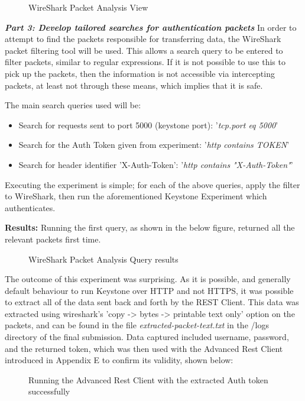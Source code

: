 \begin{figure}[H]
\centering
{}
\caption{WireShark Packet Analysis View}
\end{figure}

\textbf{\textit{Part 3: Develop tailored searches for authentication packets}}
In order to attempt to find the packets responsible for transferring data, the WireShark packet filtering tool will be used. This allows a search query to be entered to filter packets, similar to regular expressions. 
If it is not possible to use this to pick up the packets, then the information is not accessible via intercepting packets, at least not through these means, which implies that it is safe.

The main search queries used will be:
\begin{itemize}
\item Search for requests sent to port 5000 (keystone port):    '\textit{tcp.port eq 5000}' 
\item Search for the Auth Token given from experiment: '\textit{http contains TOKEN}' 
\item Search for header identifier 'X-Auth-Token':      '\textit{http contains "X-Auth-Token"}'
\end{itemize} 

Executing the experiment is simple; for each of the above queries, apply the filter to WireShark, then run the aforementioned Keystone Experiment which authenticates. 

\textbf{Results:} 
Running the first query, as shown in the below figure, returned all the relevant packets first time. 
\begin{figure}[H]
\centering
{}
\caption{WireShark Packet Analysis Query results}
\end{figure}

The outcome of this experiment was surprising. As it is possible, and generally default behaviour to run Keystone over HTTP and not HTTPS, it was possible to extract all of the data sent back and forth by the REST Client. This data was extracted using wireshark's 'copy -> bytes -> printable text only' option on the packets, and can be found in the file \textit{extracted-packet-text.txt} in the /logs directory of the final submission. Data captured included username, password, and the returned token, which was then used with the Advanced Rest Client introduced in Appendix E to confirm its validity, shown below: 
\begin{figure}[H]
\centering
{}
\caption{Running the Advanced Rest Client with the extracted Auth token successfully}
\end{figure}

